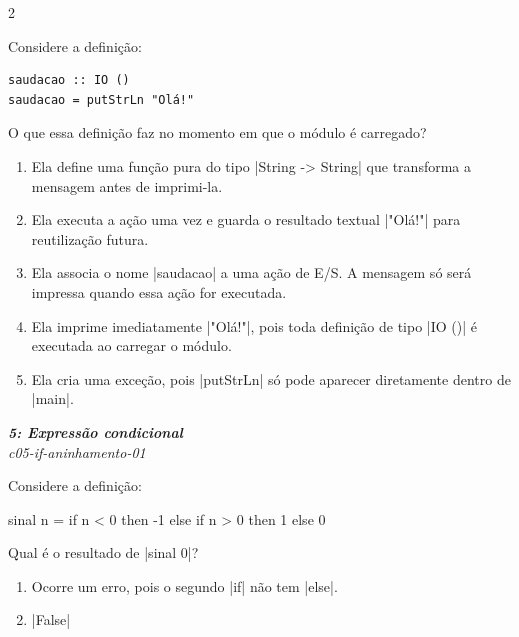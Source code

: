 \documentclass[a4paper,10pt,brazil]{article}
\begin{document}
\begin{multicols}{2}
\begin{flushright}
\end{flushright}
Considere a definição:

\begin{verbatim}
saudacao :: IO ()
saudacao = putStrLn "Olá!"
\end{verbatim}

O que essa definição faz no momento em que o módulo é carregado?

\begin{enumerate}
  \item Ela define uma função pura do tipo \haskellinline|String -> String| que transforma a mensagem antes de imprimi-la.

  \item Ela executa a ação uma vez e guarda o resultado textual \haskellinline|"Olá!"| para reutilização futura.

  \item Ela associa o nome \haskellinline|saudacao| a uma ação de E/S. A mensagem só será impressa quando essa ação for executada.

  \item Ela imprime imediatamente \haskellinline|"Olá!"|, pois toda definição de tipo \haskellinline|IO ()| é executada ao carregar o módulo.

  \item Ela cria uma exceção, pois \haskellinline|putStrLn| só pode aparecer diretamente dentro de \haskellinline|main|.


\end{enumerate}

\begin{flushright}
  \footnotesize
  \textit{\textbf{5: Expressão condicional}}\\
  \textit{c05-if-aninhamento-01}\\

\end{flushright}
Considere a definição:
\begin{haskellcode}
sinal n = if n < 0 then -1 else if n > 0 then 1 else 0
\end{haskellcode}
Qual é o resultado de \haskellinline|sinal 0|?

\begin{enumerate}
  \item Ocorre um erro, pois o segundo \haskellinline|if| não tem \haskellinline|else|.

  \item \haskellinline|False|


\end{enumerate}
\end{multicols}
\end{document}
